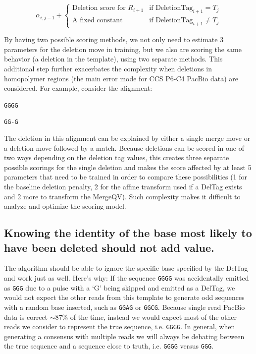 \documentclass[fleqn,10pt]{SelfArx} %
\begin{document}
\[
	\alpha_{i,j-1}  +  \begin{cases}
							 \text{Deletion score  for } R_{i+1}  & \text{if }  \text{DeletionTag}_{i+1} = T_{j} \\
							 \text{A fixed constant} & \text{if }  \text{DeletionTag}_{i+1} \neq T_{j} 
							 \end{cases}
\]

By having two possible scoring methods, we not only need to estimate 3 parameters for the deletion move in training, but we also are scoring the same behavior (a deletion in the template), using two separate methods.  This additional step further exacerbates the complexity when deletions in homopolymer regions (the main error mode for CCS P6-C4 PacBio data) are considered.  For example, consider the alignment:

\begin{center}
\texttt{GGGG}

\texttt{GG-G}
\end{center}

The deletion in this alignment can be explained by either a single merge move or a deletion move followed by a match.  Because deletions can be scored in one of two ways depending on the deletion tag values, this creates three separate possible scorings for the single deletion and makes the score affected by at least 5 parameters that need to be trained in order to compare these possibilities (1 for the baseline deletion penalty, 2 for the affine transform used if a DelTag exists and 2 more to transform the MergeQV).  Such complexity makes it difficult to analyze and optimize the scoring model.

\subsection{Knowing the identity of the base most likely to have been deleted should not add value.}

The algorithm should be able to ignore the specific base specified by the DelTag and work just as well.  Here's why: If the sequence \texttt{GGGG} was accidentally emitted as \texttt{GGG} due to a pulse with a `G' being skipped and emitted as a DelTag, we would not expect the other reads from this template to generate odd sequences with a random base inserted,  such as \texttt{GGAG} or \texttt{GGCG}.  Because single read PacBio data is correct $\sim87\%$ of the time, instead we would expect most of the other reads we consider to represent the true sequence, i.e. \texttt{GGGG}.  In general, when generating a consensus with multiple reads we will always be debating between the true sequence and a sequence close to truth, i.e. \texttt{GGGG} versus \texttt{GGG}.
\end{document}
